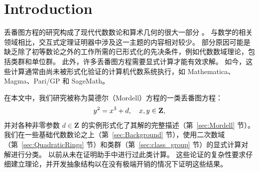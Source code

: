 \documentclass[sigplan,10pt,nonacm,
screen]{acmart} \settopmatter{printfolios=true,printccs=false,printacmref=false}
\newcommand{\ab}[1]{\todo[color=green]{AB: #1}}
\newcommand{\ZZ}{\mathbf{Z}}
\begin{document}


\maketitle

\section{Introduction}\label{sec:Intro}%

丢番图方程的研究构成了现代代数数论和算术几何的很大一部分 \cite{cohen2007number}。
与数学的相关领域相比，交互式定理证明器中涉及这一主题的内容相对较少。
部分原因可能是缺乏除了初等数论之外的工作所需的已形式化的先决条件，例如代数数域理论，包括类群和单位群。
此外，许多丢番图方程需要显式计算才能有效求解。
如今，这些计算通常由尚未被形式化验证的计算机代数系统执行，如 Mathematica、Magma、Pari/GP 和 SageMath。

在本文中，我们研究被称为莫德尔（Mordell）方程的一类丢番图方程：
\begin{equation}\label{eqn:Mordell}
 y^2=x^3+d, \quad x,y \in \ZZ\text,
\end{equation}
并对各种非零参数 $d \in \ZZ$ 的实例形式化了其解的完整描述（第~\ref{sec:Mordell} 节）。
我们在一些基础代数数论之上（第~\ref{sec:Background} 节），使用二次数域（第~\ref{sec:QuadraticRings} 节）和类群（第~\ref{sec:class_group} 节）的显式计算对解进行分类。
以前从未在证明助手中进行过此类计算。
这些论证的复杂性要求仔细建立理论，并开发抽象结构以在没有极端开销的情况下证明这些结果。
\end{document}
